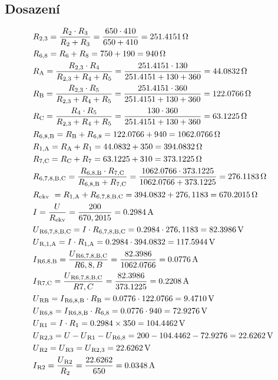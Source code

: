  \subsection{Dosazení}
	\begin{align*}
		&R\textsubscript{2,3} = \frac{R\textsubscript{2} \cdot R\textsubscript{3}}{R\textsubscript{2}+R\textsubscript{3}}= \frac{650 \cdot 410}{650+410} = \SI{251.4151}{\ohm} \\ 
		&R\textsubscript{6,8} = R\textsubscript{6} + R\textsubscript{8} = 750 + 190 = \SI{940}{\ohm} \\ 
		&R\textsubscript{A} = \frac{R\textsubscript{2,3} \cdot R\textsubscript{4}}{R\textsubscript{2,3}+R\textsubscript{4}+R\textsubscript{5}} = \frac{251.4151 \cdot 130}{251.4151+130+360} = \SI{44.0832}{\ohm} \\
		&R\textsubscript{B} = \frac{R\textsubscript{2,3} \cdot R\textsubscript{5}}{R\textsubscript{2,3}+R\textsubscript{4}+R\textsubscript{5}} = \frac{251.4151 \cdot 360}{251.4151+130+360} = \SI{122.0766}{\ohm} \\
		&R\textsubscript{C} = \frac{R\textsubscript{4} \cdot R\textsubscript{5}}{R\textsubscript{2,3}+R\textsubscript{4}+R\textsubscript{5}} = \frac{130 \cdot 360}{251.4151+130+360} = \SI{63.1225}{\ohm} \\
		&R\textsubscript{6,8,B} = R\textsubscript{B} + R\textsubscript{6,8} = 122.0766 + 940 = \SI{1062.0766}{\ohm}\\
		&R\textsubscript{1,A} = R\textsubscript{A} + R\textsubscript{1} = 44.0832 + 350 = \SI{394.0832}{\ohm} \\
		&R\textsubscript{7,C} = R\textsubscript{C} + R\textsubscript{7} = 63.1225 + 310 = \SI{373.1225}{\ohm} \\
		&R\textsubscript{6,7,8,B,C} = \frac{R\textsubscript{6,8,B} \cdot R\textsubscript{7,C}}{R\textsubscript{6,8,B}+R\textsubscript{7,C}} = \frac{1062.0766 \cdot 373.1225}{1062.0766+373.1225} = \SI{276,1183}{\ohm} \\
	&R\textsubscript{ekv}\ = R\textsubscript{1,A} + R\textsubscript{6,7,8,B,C} = 394.0832 + 276,1183 = \SI{670,2015}{\ohm} \\
	&I = \frac{U}{R\textsubscript{ekv}} = \frac{200}{670,2015} = \SI{0.2984}{\ampere} \\			         
        &U\textsubscript{R6,7,8,B,C} = I \cdot R\textsubscript{6,7,8,B,C} = 0.2984 \cdot 276,1183 = \SI{82.3986}{\volt} \\
		&U\textsubscript{R,1,A} = I \cdot R\textsubscript{1,A} = 0.2984 \cdot 394.0832 = \SI{117.5944}{\volt}\\
		&I\textsubscript{R6,8,B} = \frac{U\textsubscript{R6,7,8,B,C}}{R6,8,B} = \frac{82.3986}{1062.0766} = \SI{0.0776}{\ampere} \\
		&I\textsubscript{R7,C} = \frac{U\textsubscript{R6,7,8,B,C}}{R7,C} = \frac{82.3986}{373.1225} = \SI{0.2208}{\ampere} \\ 
		&U\textsubscript{RB} = I\textsubscript{R6,8,B} \cdot R\textsubscript{B} = 0.0776 \cdot 122.0766 = \SI{9.4710}{\volt}\\
		&U\textsubscript{R6,8} = I\textsubscript{R6,8,B} \cdot R\textsubscript{6,8} = 0.0776 \cdot 940 = \SI{72.9276}{\volt} \\
		&U\textsubscript{R1} = I \cdot R\textsubscript{1} = 0.2984 \times 350 = \SI{104.4462}{\volt}\\
		&U\textsubscript{R2,3} = U - U\textsubscript{R1} - U\textsubscript{R6,8} = 200 - 104.4462 - 72.9276 = \SI{22.6262}{\volt} \\
		&U\textsubscript{R2} = U\textsubscript{R3} = U\textsubscript{R2,3} = \SI{22.6262}{\volt} \\
		&I\textsubscript{R2} = \frac{U\textsubscript{R2}}{R\textsubscript{2}} = \frac{22.6262}{650} = \SI{0.0348}{\ampere}
	\end{align*}